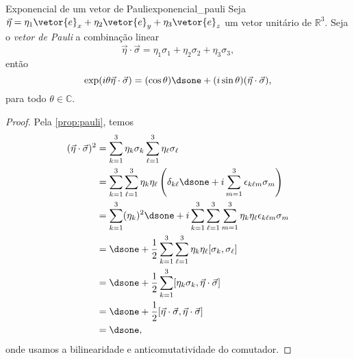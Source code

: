 \begin{proposition}{Exponencial de um vetor de Pauli}{exponencial_pauli}
    Seja \(\vec\eta = \eta_1 \vetor{e}_x + \eta_2\vetor{e}_y + \eta_3 \vetor{e}_z\) um vetor unitário de \(\mathbb{R}^3\). Seja o \emph{vetor de Pauli} a combinação linear
    \begin{equation*}
        \vec\eta \cdot \vec\sigma = \eta_1 \sigma_1 + \eta_2 \sigma_2 + \eta_3 \sigma_3,
    \end{equation*}
    então
    \begin{equation*}
        \exp(i \theta \vec\eta \cdot \vec\sigma) = (\cos\theta)\dsone + (i\sin\theta)(\vec\eta \cdot\vec\sigma),
    \end{equation*}
    para todo \(\theta\in \mathbb{C}.\)
\end{proposition}
\begin{proof}
    Pela \cref{prop:pauli}, temos
    \begin{align*}
        (\vec \eta \cdot \vec \sigma)^2 &= \sum_{k=1}^3 \eta_k \sigma_k \sum_{\ell = 1}^3 \eta_\ell \sigma_\ell\\
                                        &= \sum_{k=1}^3\sum_{\ell=1}^3 \eta_k \eta_\ell \left(\delta_{k\ell}\dsone + i \sum_{m = 1}^3 \epsilon_{k\ell m}\sigma_m\right)\\
                                        &= \sum_{k=1}^3 (\eta_k)^2 \dsone + i\sum_{k=1}^3\sum_{\ell=1}^3 \sum_{m = 1}^3 \eta_k \eta_\ell\epsilon_{k\ell m}\sigma_m\\
                                        &= \dsone + \frac12 \sum_{k=1}^3\sum_{\ell=1}^3 \eta_k \eta_\ell [\sigma_k, \sigma_\ell]\\
                                        &= \dsone + \frac12 \sum_{k=1}^3 [\eta_k \sigma_k, \vec \eta \cdot \vec \sigma]\\
                                        &= \dsone + \frac12 [\vec \eta\cdot \vec \sigma, \vec \eta\cdot \vec \sigma]\\
                                        &= \dsone,
    \end{align*}
    onde usamos a bilinearidade e anticomutatividade do comutador.


\end{proof}
